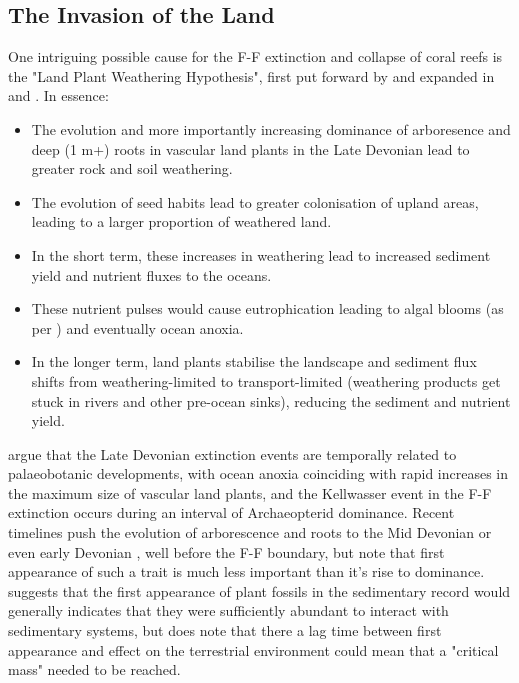 \documentclass[11pt,a4paper]{article}
\begin{document}
\subsection{The Invasion of the Land}

One intriguing possible cause for the F-F extinction and collapse of coral reefs is the "Land Plant Weathering Hypothesis", first put forward by \cite{Algeo1995} and expanded in \cite{Algeo1998} and \cite{Algeo2010}. In essence:

\begin{itemize}
  \item The evolution and more importantly increasing dominance of arboresence and deep (1 m+) roots in vascular land plants in the Late Devonian lead to greater rock and soil weathering. 
  \item The evolution of seed habits lead to greater colonisation of upland areas, leading to a larger proportion of weathered land.
  \item In the short term, these increases in weathering lead to increased sediment yield and nutrient fluxes to the oceans. 
  \item These nutrient pulses would cause eutrophication leading to algal blooms (as per \cite{WuFengGong2013}) and eventually ocean anoxia.
  \item In the longer term, land plants stabilise the landscape and sediment flux shifts from weathering-limited to transport-limited (weathering products get stuck in rivers and other pre-ocean sinks), reducing the sediment and nutrient yield.
\end{itemize}


\cite{Algeo1995} argue that the Late Devonian extinction events are temporally related to palaeobotanic developments, with ocean anoxia coinciding with rapid increases in the maximum size of vascular land plants, and the Kellwasser event in the F-F extinction occurs during an interval of Archaeopterid dominance.
 Recent timelines push the evolution of arborescence and roots to the Mid Devonian or even early Devonian \citep{Hetherington2018}, well before the F-F boundary, but \cite{Algeo1995} note that first appearance of such a trait is much less important than it's rise to dominance. 
\cite{Davies2010} suggests that the first appearance of plant fossils in the sedimentary record would generally indicates that they were sufficiently abundant to interact with sedimentary systems, but does note that there a lag time between first appearance and effect on the terrestrial environment could mean that a "critical mass" needed to be reached.
\end{document}
